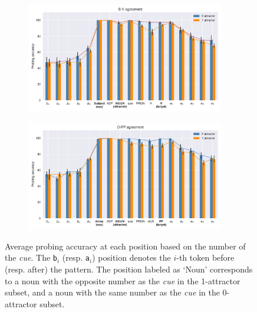 \begin{figure}[htbp]
    \begin{subfigure}{\textwidth}
        \centering\includegraphics[width=0.95\textwidth]{figures/probing_subj-v.pdf}
    \end{subfigure}
    \vspace{0.2cm}
    \begin{subfigure}{\textwidth}
        \centering\includegraphics[width=0.95\textwidth]{figures/probing_obj-pp.pdf}
    \end{subfigure}
    \caption{Average probing accuracy at each position based on the number of the
      \emph{cue}. The \texttt{b$_i$} (resp. \texttt{a$_i$}) position
      denotes the $i$-th token before (resp. after) the pattern. The position labeled as `Noun' corresponds to a noun with the opposite number as the \emph{cue} in the 1-attractor subset, and a noun with the same number as the \emph{cue} in the 0-attractor subset.
      \label{fig:fix5}}
\end{figure}

